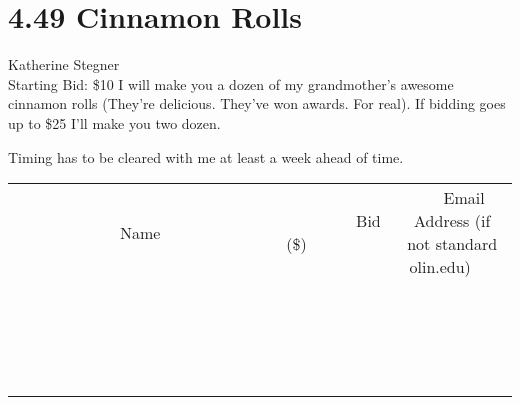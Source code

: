 \documentclass[11pt]{article}
\begin{document}
\section*{4.49 Cinnamon Rolls}
Katherine Stegner
\\
Starting Bid: \$10
\newline
I will make you a dozen of my grandmother's awesome cinnamon rolls (They're delicious. They've won awards. For real). 
If bidding goes up to \$25 I'll make you two dozen.

Timing has to be cleared with me at least a week ahead of time.
\\[3ex]
\begin{tabular}{c c c}
~~~~~~~~~~~~~Name~~~~~~~~~~~~~ & ~~~~~~~~~Bid (\$)~~~~~~~~~  & ~~~Email Address (if not standard olin.edu)~~~\\
 & & \\
\hline
 & & \\
\hline
 & & \\
\hline
 & & \\
\hline
 & & \\
\hline
 & & \\
\hline
 & & \\
\hline
 & & \\
\hline
 & & \\
\hline
 & & \\
\hline
 & & \\
\hline
 & & \\
\hline
 & & \\
\hline
 & & \\
\hline
 & & \\
\hline
 & & \\
\hline
 & & \\
\hline
 & & \\
\hline
 & & \\
\hline
\end{tabular}
\newpage
\end{document}
